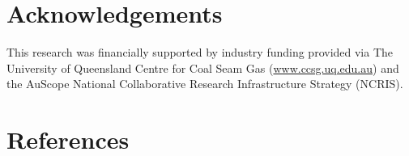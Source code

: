 \documentclass[review,authoryear]{elsarticle}
\begin{document}
\section{Acknowledgements}
This research was financially supported by industry funding provided via The University of Queensland Centre for Coal Seam Gas (\url{www.ccsg.uq.edu.au}) and the AuScope National Collaborative Research Infrastructure Strategy (NCRIS).

\section*{References}
 

\end{document}
